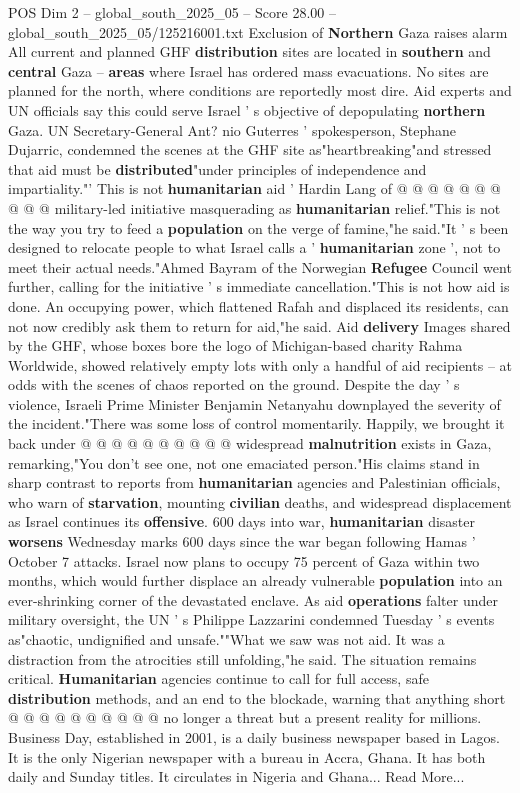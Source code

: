 \begin{textsample}{POS Dim 2 – global\_south\_2025\_05 – Score 28.00 – global\_south\_2025\_05/125216001.txt}
Exclusion of \textbf{Northern} Gaza raises alarm All current and planned GHF \textbf{distribution} sites are located in \textbf{southern} and \textbf{central} Gaza -- \textbf{areas} where Israel has ordered mass evacuations.
No sites are planned for the north, where conditions are reportedly most dire.
Aid experts and UN officials say this could serve Israel ' s objective of depopulating \textbf{northern} Gaza.
UN Secretary-General Ant? nio Guterres ' spokesperson, Stephane Dujarric, condemned the scenes at the GHF site as"heartbreaking"and stressed that aid must be \textbf{distributed}"under principles of independence and impartiality."' This is not \textbf{humanitarian} aid ' Hardin Lang of @ @ @ @ @ @ @ @ @ @ military-led initiative masquerading as \textbf{humanitarian} relief."This is not the way you try to feed a \textbf{population} on the verge of famine,"he said."It ' s been designed to relocate people to what Israel calls a ' \textbf{humanitarian} zone ', not to meet their actual needs."Ahmed Bayram of the Norwegian \textbf{Refugee} Council went further, calling for the initiative ' s immediate cancellation."This is not how aid is done.
An occupying power, which flattened Rafah and displaced its residents, can not now credibly ask them to return for aid,"he said.
Aid \textbf{delivery} Images shared by the GHF, whose boxes bore the logo of Michigan-based charity Rahma Worldwide, showed relatively empty lots with only a handful of aid recipients -- at odds with the scenes of chaos reported on the ground.
Despite the day ' s violence, Israeli Prime Minister Benjamin Netanyahu downplayed the severity of the incident."There was some loss of control momentarily.
Happily, we brought it back under @ @ @ @ @ @ @ @ @ @ widespread \textbf{malnutrition} exists in Gaza, remarking,"You don't see one, not one emaciated person."His claims stand in sharp contrast to reports from \textbf{humanitarian} agencies and Palestinian officials, who warn of \textbf{starvation}, mounting \textbf{civilian} deaths, and widespread displacement as Israel continues its \textbf{offensive}. 600 days into war, \textbf{humanitarian} disaster \textbf{worsens} Wednesday marks 600 days since the war began following Hamas ' October 7 attacks.
Israel now plans to occupy 75 percent of Gaza within two months, which would further displace an already vulnerable \textbf{population} into an ever-shrinking corner of the devastated enclave.
As aid \textbf{operations} falter under military oversight, the UN ' s Philippe Lazzarini condemned Tuesday ' s events as"chaotic, undignified and unsafe.""What we saw was not aid.
It was a distraction from the atrocities still unfolding,"he said.
The situation remains critical. \textbf{Humanitarian} agencies continue to call for full access, safe \textbf{distribution} methods, and an end to the blockade, warning that anything short @ @ @ @ @ @ @ @ @ @ no longer a threat but a present reality for millions.
Business Day, established in 2001, is a daily business newspaper based in Lagos.
It is the only Nigerian newspaper with a bureau in Accra, Ghana.
It has both daily and Sunday titles.
It circulates in Nigeria and Ghana...
Read More...


\end{textsample}
